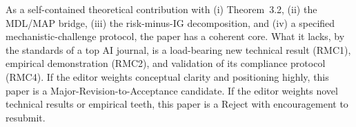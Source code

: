 \documentclass[11pt]{article}
\begin{document}
As a self-contained theoretical contribution with (i) Theorem~3.2, (ii) the MDL/MAP bridge, (iii) the risk-minus-IG decomposition, and (iv) a specified mechanistic-challenge protocol, the paper has a coherent core. What it lacks, by the standards of a top AI journal, is a load-bearing new technical result (RMC1), empirical demonstration (RMC2), and validation of its compliance protocol (RMC4). If the editor weights conceptual clarity and positioning highly, this paper is a Major-Revision-to-Acceptance candidate. If the editor weights novel technical results or empirical teeth, this paper is a Reject with encouragement to resubmit.
\end{document}
